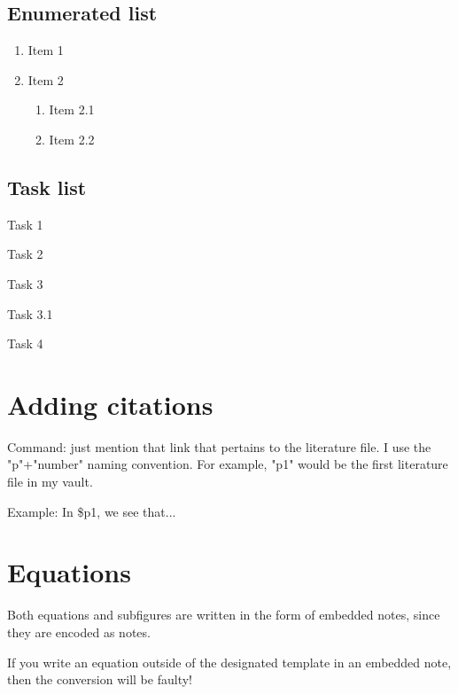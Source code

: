 \documentclass{doc_class_fontsize}{extarticle}
\begin{document}
\subsection{Enumerated list}

\begin{enumerate}
\item Item 1
\item Item 2
\begin{enumerate}
\item Item 2.1
\item Item 2.2
\end{enumerate}
\end{enumerate}


\subsection{Task list}

\begin{todolist}
\item Task 1
\item Task 2
\item Task 3
\begin{todolist}
\item Task 3.1
\end{todolist}
\item Task 4
\end{todolist}
\section{Adding citations} \label{sec:Adding-citations}

Command: just mention that link that pertains to the literature file. I use the "p"+"number" naming convention. For example, "p1" would be the first literature file in my vault.



Example: In \${p1}, we see that...  \hypertarget{ad3b86}{}


\section{Equations}

Both equations and subfigures are written in the form of embedded notes, since they are encoded as notes.

\begin{tcolorbox}[width=1.0\textwidth,colback={red},title={warning},outer arc=0mm,colupper=white]

If you write an equation outside of the designated template in an embedded note, then the conversion will be faulty!

\end{tcolorbox}
\end{document}

